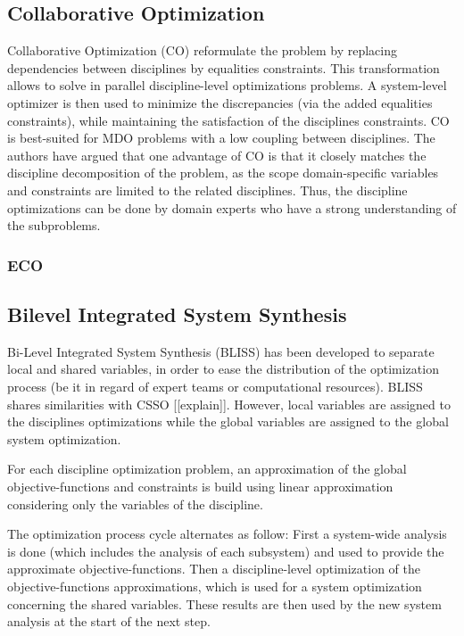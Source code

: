 \subsection{Collaborative Optimization}

Collaborative Optimization (CO) \cite{Ilan:1994:MOM:887207} reformulate the problem by replacing  dependencies between disciplines by equalities constraints. This transformation allows to solve in parallel discipline-level optimizations problems. A system-level optimizer is then used to minimize the discrepancies (via the added equalities constraints), while maintaining the satisfaction of the disciplines constraints.
CO is best-suited for MDO problems with a low coupling between disciplines. The authors have argued that one advantage of CO is that it closely matches the discipline decomposition of the problem, as the scope domain-specific variables and constraints are limited to the related disciplines. Thus, the discipline optimizations can be done by domain experts  who have a strong understanding of the subproblems.

\subsubsection{ECO}

\subsection{Bilevel Integrated System Synthesis}

Bi-Level Integrated System Synthesis (BLISS) \cite{J.:1998:BIS:886310} has been developed to separate local and shared variables, in order to ease the distribution of the optimization process (be it in regard of expert teams or computational resources).
BLISS shares similarities with CSSO [[explain]]. However, local variables are assigned to the disciplines optimizations while the global variables are assigned to the global system optimization.

For each discipline optimization problem, an approximation of the global objective-functions and constraints is build using linear approximation considering only the variables of the discipline.

The optimization process cycle alternates as follow: First a system-wide analysis is done (which includes the analysis of each subsystem) and used to provide the approximate objective-functions. Then a discipline-level optimization of the objective-functions approximations, which is used for a system optimization concerning the shared variables. These results are then used by the new system analysis at the start of the next step.

